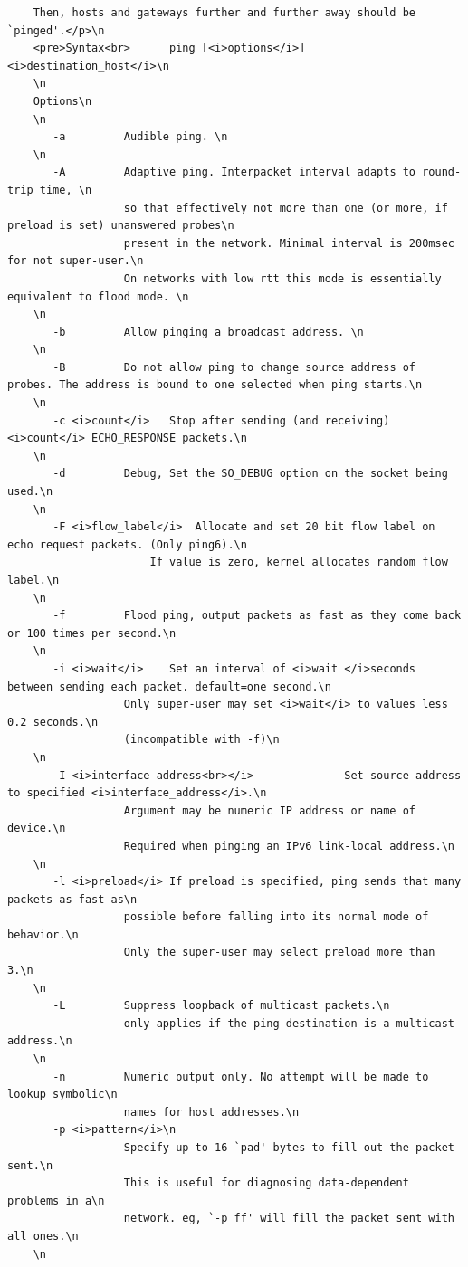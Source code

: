 \documentclass[12pt]{article} %
\begin{document}
\begin{verbatim}
    Then, hosts and gateways further and further away should be `pinged'.</p>\n
    <pre>Syntax<br>      ping [<i>options</i>] <i>destination_host</i>\n
    \n
    Options\n
    \n
       -a         Audible ping. \n
    \n
       -A         Adaptive ping. Interpacket interval adapts to round-trip time, \n
                  so that effectively not more than one (or more, if preload is set) unanswered probes\n
                  present in the network. Minimal interval is 200msec for not super-user.\n
                  On networks with low rtt this mode is essentially equivalent to flood mode. \n
    \n
       -b         Allow pinging a broadcast address. \n
    \n
       -B         Do not allow ping to change source address of probes. The address is bound to one selected when ping starts.\n
    \n
       -c <i>count</i>   Stop after sending (and receiving) <i>count</i> ECHO_RESPONSE packets.\n
    \n
       -d         Debug, Set the SO_DEBUG option on the socket being used.\n
    \n
       -F <i>flow_label</i>  Allocate and set 20 bit flow label on echo request packets. (Only ping6).\n
                      If value is zero, kernel allocates random flow label.\n
    \n
       -f         Flood ping, output packets as fast as they come back or 100 times per second.\n
    \n
       -i <i>wait</i>    Set an interval of <i>wait </i>seconds between sending each packet. default=one second.\n
                  Only super-user may set <i>wait</i> to values less 0.2 seconds.\n
                  (incompatible with -f)\n
    \n
       -I <i>interface address<br></i>              Set source address to specified <i>interface_address</i>.\n
                  Argument may be numeric IP address or name of device.\n
                  Required when pinging an IPv6 link-local address.\n
    \n
       -l <i>preload</i> If preload is specified, ping sends that many packets as fast as\n
                  possible before falling into its normal mode of behavior.\n
                  Only the super-user may select preload more than 3.\n
    \n
       -L         Suppress loopback of multicast packets.\n
                  only applies if the ping destination is a multicast address.\n
    \n
       -n         Numeric output only. No attempt will be made to lookup symbolic\n
                  names for host addresses.\n
       -p <i>pattern</i>\n
                  Specify up to 16 `pad' bytes to fill out the packet sent.\n
                  This is useful for diagnosing data-dependent problems in a\n
                  network. eg, `-p ff' will fill the packet sent with all ones.\n
    \n

\end{verbatim}
\end{document}
